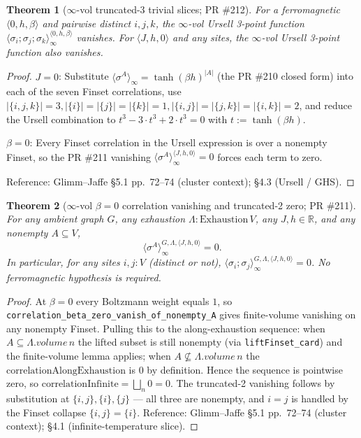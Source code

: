 \documentclass[a4paper,11pt]{article}
\newtheorem{theorem}{Theorem}
\begin{document}
\begin{theorem}[$\infty$-vol truncated-3 trivial slices; PR \#212]
For a ferromagnetic $\langle 0, h, \beta\rangle$ and pairwise
distinct $i, j, k$, the $\infty$-vol Ursell 3-point function
$\langle \sigma_i; \sigma_j; \sigma_k \rangle_\infty^{\langle
0,h,\beta\rangle}$ vanishes. For $\langle J, h, 0\rangle$ and any
sites, the $\infty$-vol Ursell 3-point function also vanishes.
\end{theorem}

\begin{proof}
$J = 0$: Substitute
$\langle \sigma^A \rangle_\infty = \tanh(\beta h)^{|A|}$ (the PR \#210
closed form) into each of the seven Finset correlations, use
$|\{i,j,k\}| = 3, |\{i\}|=|\{j\}|=|\{k\}|=1,
|\{i,j\}|=|\{j,k\}|=|\{i,k\}|=2$, and reduce the Ursell
combination to $t^3 - 3\cdot t^3 + 2\cdot t^3 = 0$ with
$t := \tanh(\beta h)$.

$\beta = 0$: Every Finset correlation in the Ursell expression is
over a nonempty Finset, so the PR \#211 vanishing
$\langle \sigma^A \rangle_\infty^{\langle J,h,0\rangle} = 0$
forces each term to zero.

Reference: Glimm--Jaffe \cite{glimm-jaffe} \S 5.1 pp.~72--74
(cluster context); \S 4.3 (Ursell / GHS).
\end{proof}

\begin{theorem}[$\infty$-vol $\beta = 0$ correlation vanishing and
truncated-2 zero; PR \#211]
For any ambient graph $G$, any exhaustion $\Lambda :
\mathrm{Exhaustion}\,V$, any $J, h \in \mathbb{R}$, and any
nonempty $A \subseteq V$,
\[
  \langle \sigma^A \rangle_\infty^{G,\Lambda,\langle J,h,0\rangle}
  = 0.
\]
In particular, for any sites $i, j : V$ (distinct or not),
$\langle \sigma_i; \sigma_j \rangle_\infty^{G,\Lambda,\langle
J,h,0\rangle} = 0$.
No ferromagnetic hypothesis is required.
\end{theorem}

\begin{proof}
At $\beta = 0$ every Boltzmann weight equals $1$, so
\texttt{correlation\_beta\_zero\_vanish\_of\_nonempty\_A} gives
finite-volume vanishing on any nonempty Finset. Pulling this to
the along-exhaustion sequence: when $A \subseteq \Lambda.volume\,n$
the lifted subset is still nonempty (via \texttt{liftFinset\_card})
and the finite-volume lemma applies; when
$A \not\subseteq \Lambda.volume\,n$ the
$\mathrm{correlationAlongExhaustion}$ is $0$ by definition. Hence
the sequence is pointwise zero, so
$\mathrm{correlationInfinite} = \bigsqcup_n 0 = 0$.
The truncated-2 vanishing follows by substitution at
$\{i,j\}, \{i\}, \{j\}$ — all three are nonempty, and $i = j$ is
handled by the Finset collapse $\{i,j\} = \{i\}$.
Reference: Glimm--Jaffe \cite{glimm-jaffe} \S 5.1 pp.~72--74
(cluster context); \S 4.1 (infinite-temperature slice).
\end{proof}
\end{document}
